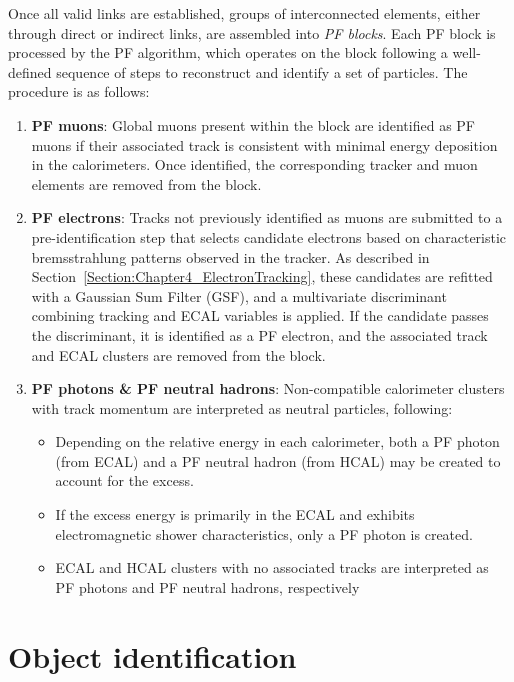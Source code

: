 Once all valid links are established, groups of interconnected elements, either through direct or indirect links, are assembled into \textit{PF blocks}. Each PF block is processed by the PF algorithm, which operates on the block following a well-defined sequence of steps to reconstruct and identify a set of particles. The procedure is as follows:

\begin{enumerate}
    \item \textbf{PF muons}: Global muons present within the block are identified as PF muons if their associated track is consistent with minimal energy deposition in the calorimeters. Once identified, the corresponding tracker and muon elements are removed from the block.
    \item \textbf{PF electrons}: Tracks not previously identified as muons are submitted to a pre-identification step that selects candidate electrons based on characteristic bremsstrahlung patterns observed in the tracker. As described in Section~\ref{Section:Chapter4_ElectronTracking}, these candidates are refitted with a Gaussian Sum Filter (GSF), and a multivariate discriminant combining tracking and ECAL variables is applied. If the candidate passes the discriminant, it is identified as a PF electron, and the associated track and ECAL clusters are removed from the block.
    \item \textbf{PF photons \& PF neutral hadrons}: Non-compatible calorimeter clusters with track momentum are interpreted as neutral particles, following:
    \begin{itemize}
        \item Depending on the relative energy in each calorimeter, both a PF photon (from ECAL) and a PF neutral hadron (from HCAL) may be created to account for the excess.
        \item If the excess energy is primarily in the ECAL and exhibits electromagnetic shower characteristics, only a PF photon is created.
        \item ECAL and HCAL clusters with no associated tracks are interpreted as PF photons and PF neutral hadrons, respectively
    \end{itemize}
\end{enumerate}

\section{Object identification}
\label{Section:Chapter4_Object_Identification}

